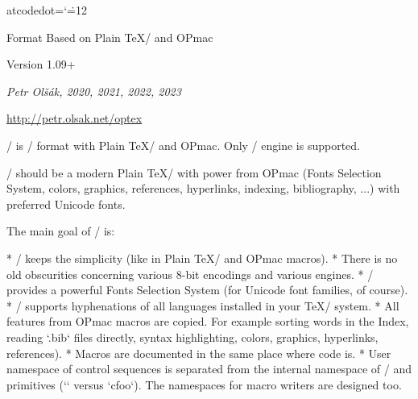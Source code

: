 

  \let\enddocument=\endinput
\let\_catcodedot=\relax \catcode`\.=12 %

\typosize[10/12]  %

\begingroup \typosize [11/13.5] %



\centerline{\rm\OpTeX}
\vskip-8mm

\tit Format Based on Plain \TeX/ and OPmac

\hfill Version 1.09+

\centerline{\it Petr Olšák, 2020, 2021, 2022, 2023}

\bigskip
\centerline{\url{http://petr.olsak.net/optex}}


\bigskip
\noindent
\OpTeX/ is \LuaTeX/ format with Plain \TeX/ and OPmac. Only \LuaTeX/ engine
is supported. 

\OpTeX/ should be a modern Plain \TeX/ with power from OPmac (Fonts
Selection System, colors, graphics, references, hyperlinks,
indexing, bibliography, ...) with preferred Unicode fonts.

The main goal of \OpTeX/ is:

\begitems
* \OpTeX/ keeps the simplicity (like in Plain \TeX/ and OPmac macros).
* There is no old obscurities concerning various 8-bit encodings and
  various engines.
* \OpTeX/ provides a powerful Fonts Selection System (for Unicode font
  families, of course).
* \OpTeX/ supports hyphenations of all languages installed in your \TeX/ system.
* All features from OPmac macros are copied. For example sorting words in
  the Index, reading `.bib` files directly, syntax 
  highlighting, colors, graphics, hyperlinks, references).
* Macros are documented in the same place where code is.
* User namespace of control sequences is separated from the internal namespace
  of \OpTeX/ and primitives (`\foo` versus `\_foo`).
  The namespaces for macro writers are designed too.
\enditems

